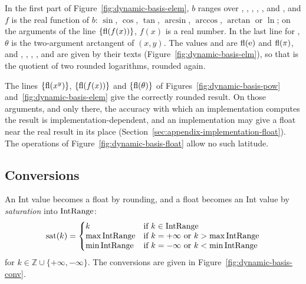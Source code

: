 In the first part of Figure~\ref{fig:dynamic-basis-elem}, $b$ ranges over
, , , , ,  and
, and $f$ is the
real function of $b$: $\sin$, $\cos$, $\tan$, $\arcsin$, $\arccos$, $\arctan$
or $\ln$; on the arguments of the line $\{\mathrm{fl}(f(x))\}$, $f(x)$ is a real
number. In the last line for , $\theta$ is the two-argument
arctangent of $(x,y)$. The values  and  are $\mathrm{fl}(\mathrm{e})$
and $\mathrm{fl}(\pi)$, and , , ,
,  and  are given by their texts
(Figure~\ref{fig:dynamic-basis-elm}), so that  is the
quotient of two rounded logarithms, rounded again.

The lines $\{\mathrm{fl}(x^{y})\}$, $\{\mathrm{fl}(f(x))\}$ and $\{\mathrm{fl}(\theta)\}$ of
Figures~\ref{fig:dynamic-basis-pow} and~\ref{fig:dynamic-basis-elem} give the
correctly rounded result. On those arguments, and only there, the accuracy
with which an implementation computes the result is implementation-dependent,
and an implementation may give a float near the real result in its place
(Section~\ref{sec:appendix-implementation-float}). The operations of
Figure~\ref{fig:dynamic-basis-float} allow no such latitude. %

\subsection{Conversions}\label{sec:appendix-dynamic-basis-conv}

An Int value becomes a float by rounding, and a float becomes an Int value by
\emph{saturation} into $\mathrm{IntRange}$:
\[
  \dbsat(k)=\left\{
  \begin{array}{@{}ll@{}}
  k & \text{if}\ k\in\IntRange\\
  \max\IntRange & \text{if}\ k=+\infty\ \text{or}\ k>\max\IntRange\\
  \min\IntRange & \text{if}\ k=-\infty\ \text{or}\ k<\min\IntRange
  \end{array}\right.
\]
for $k\in\mathbb{Z}\cup\{+\infty,-\infty\}$. The conversions are given in Figure~\ref{fig:dynamic-basis-conv}. %

